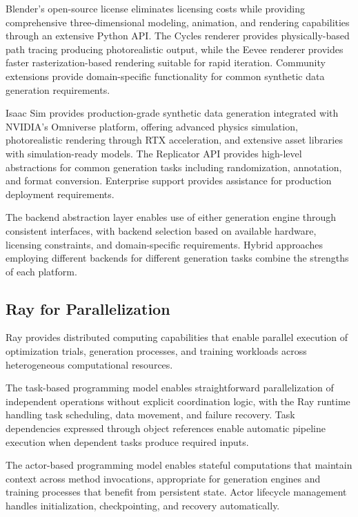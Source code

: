 Blender's open-source license eliminates licensing costs while providing comprehensive three-dimensional modeling, animation, and rendering capabilities through an extensive Python API. The Cycles renderer provides physically-based path tracing producing photorealistic output, while the Eevee renderer provides faster rasterization-based rendering suitable for rapid iteration. Community extensions provide domain-specific functionality for common synthetic data generation requirements.

Isaac Sim provides production-grade synthetic data generation integrated with NVIDIA's Omniverse platform, offering advanced physics simulation, photorealistic rendering through RTX acceleration, and extensive asset libraries with simulation-ready models. The Replicator API provides high-level abstractions for common generation tasks including randomization, annotation, and format conversion. Enterprise support provides assistance for production deployment requirements.

The backend abstraction layer enables use of either generation engine through consistent interfaces, with backend selection based on available hardware, licensing constraints, and domain-specific requirements. Hybrid approaches employing different backends for different generation tasks combine the strengths of each platform.

\subsection{Ray for Parallelization}

Ray provides distributed computing capabilities that enable parallel execution of optimization trials, generation processes, and training workloads across heterogeneous computational resources.

The task-based programming model enables straightforward parallelization of independent operations without explicit coordination logic, with the Ray runtime handling task scheduling, data movement, and failure recovery. Task dependencies expressed through object references enable automatic pipeline execution when dependent tasks produce required inputs.

The actor-based programming model enables stateful computations that maintain context across method invocations, appropriate for generation engines and training processes that benefit from persistent state. Actor lifecycle management handles initialization, checkpointing, and recovery automatically.

